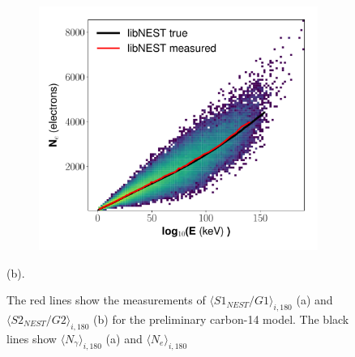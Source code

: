 \begin{figure}[h!]
\begin{subfigure}{0.5\textwidth}
  \includegraphics[width=\textwidth]{Figures/yields_corrections/C14_QN_heatmap_gfdcm_180Vcm_prelim.pdf}
  \caption{}
\end{subfigure}
\caption{The red lines show the measurements of  $\langle S1_{NEST}/G1 \rangle_{i,180}$ (a) and $\langle S2_{NEST}/G2 \rangle_{i,180}$ (b) for the preliminary carbon-14 model. The black lines show $\langle N_{\gamma} \rangle_{i,180}$ (a) and $\langle N_{e} \rangle_{i,180}$} (b).
\label{fig:lnqn_180_prelim}
\end{figure} 

